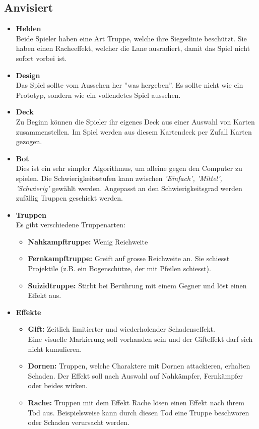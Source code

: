 \subsection{Anvisiert}
\begin{itemize}
    \item \textbf{Helden} \\
        Beide Spieler haben eine Art Truppe, welche ihre Siegeslinie beschützt. Sie haben einen Racheeffekt, welcher die
        Lane ausradiert, damit das Spiel nicht sofort vorbei ist.
    \item \textbf{Design} \\
        Das Spiel sollte vom Aussehen her ''was hergeben''. Es sollte nicht wie ein Prototyp, sondern wie ein 
        vollendetes Spiel aussehen. 
    \item \textbf{Deck} \\
        Zu Beginn können die Spieler ihr eigenes Deck aus einer Auswahl von Karten zusammenstellen. Im Spiel werden aus diesem Kartendeck per Zufall Karten gezogen.
    \item \textbf{Bot} \\
        Dies ist ein sehr simpler Algorithmus, um alleine gegen den Computer zu spielen. Die Schwierigkeitsstufen kann zwischen \textit{'Einfach', 'Mittel', 'Schwierig'} gewählt werden.
        Angepasst an den Schwierigkeitsgrad werden zufällig Truppen geschickt werden.
    \item \textbf{Truppen}\\
    Es gibt verschiedene Truppenarten:
    \begin{itemize}
        \item \textbf{Nahkampftruppe:}
            Wenig Reichweite
        \item \textbf{Fernkampftruppe:}
            Greift auf grosse Reichweite an. Sie schiesst Projektile (z.B. ein Bogenschütze, der mit Pfeilen schiesst).
        \item \textbf{Suizidtruppe:}
            Stirbt bei Berührung mit einem Gegner und löst einen Effekt aus.
    \end{itemize}
    \item \textbf{Effekte}
    \begin{itemize}
        \item \textbf{Gift:}
            Zeitlich limitierter und wiederholender Schadenseffekt. \\Eine visuelle Markierung soll vorhanden sein
            und der Gifteffekt darf sich nicht kumulieren.
        \item \textbf{Dornen:}
            Truppen, welche Charaktere mit Dornen attackieren, erhalten Schaden. Der Effekt soll nach Auswahl auf Nahkämpfer,
            Fernkämpfer oder beides wirken.
        \item \textbf{Rache:}
            Truppen mit dem Effekt Rache lösen einen Effekt nach ihrem Tod aus. Beispielsweise kann durch diesen Tod eine Truppe beschworen oder Schaden verursacht werden.
    \end{itemize}
\end{itemize}

